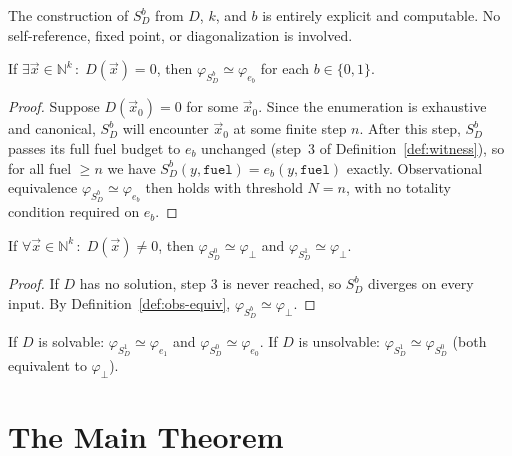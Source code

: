 \documentclass{lmcs}
\begin{document}
\begin{rem}
The construction of \(S_D^b\) from \(D\), \(k\), and \(b\) is entirely explicit and
computable. No self-reference, fixed point, or diagonalization is involved.
\end{rem}

\begin{lem}
\label{lem:solvable}
If \(\exists \vec{x} \in \mathbb{N}^k\,:\; D(\vec{x}) = 0\), then
\(\varphi_{S_D^b} \simeq \varphi_{e_b}\) for each \(b \in \{0,1\}\).
\end{lem}

\begin{proof}
Suppose \(D(\vec{x}_0) = 0\) for some \(\vec{x}_0\). Since the enumeration is
exhaustive and canonical, \(S_D^b\) will encounter \(\vec{x}_0\) at some finite
step \(n\). After this step, \(S_D^b\) passes its full fuel budget to \(e_b\)
unchanged (step~3 of Definition~\ref{def:witness}), so for all fuel \(\geq n\)
we have \(S_D^b(y, \mathtt{fuel}) = e_b(y, \mathtt{fuel})\) exactly.
Observational equivalence \(\varphi_{S_D^b} \simeq \varphi_{e_b}\) then holds
with threshold \(N = n\), with no totality condition required on \(e_b\).
\end{proof}

\begin{lem}
\label{lem:unsolvable}
If \(\forall \vec{x} \in \mathbb{N}^k\,:\; D(\vec{x}) \neq 0\), then
\(\varphi_{S_D^0} \simeq \varphi_\bot\) and \(\varphi_{S_D^1} \simeq \varphi_\bot\).
\end{lem}

\begin{proof}
If \(D\) has no solution, step 3 is never reached, so \(S_D^b\) diverges on every
input. By Definition~\ref{def:obs-equiv}, \(\varphi_{S_D^b} \simeq \varphi_\bot\).
\end{proof}

\begin{cor}
\label{cor:joint}
If \(D\) is solvable: \(\varphi_{S_D^1} \simeq \varphi_{e_1}\) and
\(\varphi_{S_D^0} \simeq \varphi_{e_0}\). If \(D\) is unsolvable:
\(\varphi_{S_D^1} \simeq \varphi_{S_D^0}\) (both equivalent to \(\varphi_\bot\)).
\end{cor}

\section{The Main Theorem}
\label{sec:main}
\end{document}
